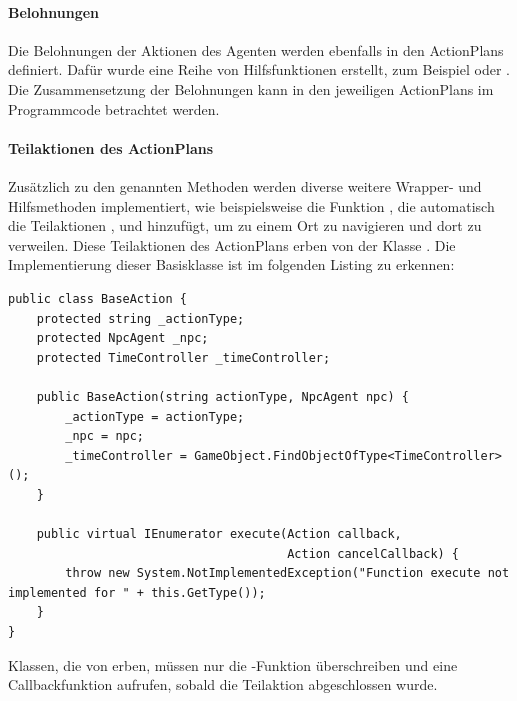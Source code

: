 \paragraph{Belohnungen}
Die Belohnungen der Aktionen des Agenten werden ebenfalls in den ActionPlans definiert. Dafür wurde eine Reihe von Hilfsfunktionen erstellt, zum Beispiel  oder . Die Zusammensetzung der Belohnungen kann in den jeweiligen ActionPlans im Programmcode betrachtet werden.


\paragraph{Teilaktionen des ActionPlans}
Zusätzlich zu den genannten Methoden werden diverse weitere Wrapper- und Hilfsmethoden implementiert, wie beispielsweise die Funktion , die automatisch die Teilaktionen ,  und  hinzufügt, um zu einem Ort zu navigieren und dort zu verweilen. Diese Teilaktionen des ActionPlans erben von der Klasse . Die Implementierung dieser Basisklasse ist im folgenden Listing zu erkennen:

\begin{minipage}{\linewidth}
\begin{lstlisting}[linewidth=16.4cm, label=lst:implementation_baseaction, caption=Implementierung von \inlinecode{BaseAction}, xleftmargin=1cm, basicstyle=\footnotesize]
public class BaseAction {
    protected string _actionType;
    protected NpcAgent _npc;
    protected TimeController _timeController;

    public BaseAction(string actionType, NpcAgent npc) {
        _actionType = actionType;
        _npc = npc;
        _timeController = GameObject.FindObjectOfType<TimeController>();
    }

    public virtual IEnumerator execute(Action callback,
                                       Action cancelCallback) {
        throw new System.NotImplementedException("Function execute not implemented for " + this.GetType());
    }
}
\end{lstlisting}
\end{minipage}

Klassen, die von  erben, müssen nur die -Funktion überschreiben und eine Callbackfunktion aufrufen, sobald die Teilaktion abgeschlossen wurde.

